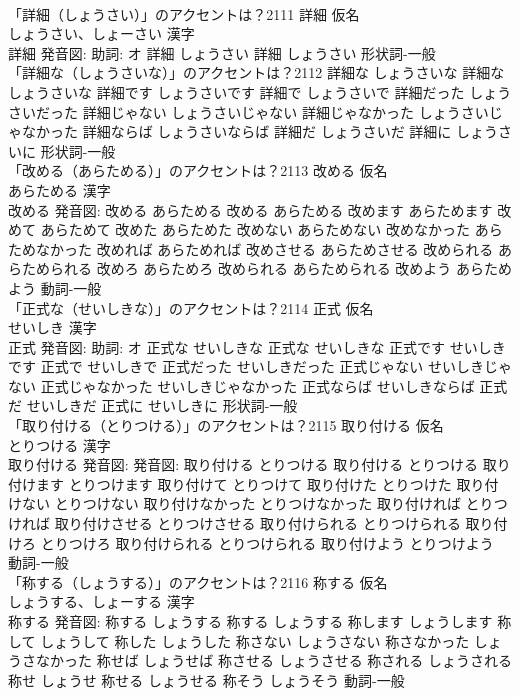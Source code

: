 \documentclass[8pt]{extreport}
\begin{document}
\begin{CJK}{UTF8}{min}
\\	「詳細（しょうさい）」のアクセントは？2111	詳細 仮名　
\\	しょうさい、しょーさい 漢字　
\\	詳細 発音図: 助詞: オ	詳細 しょうさい		詳細 しょうさい				形状詞-一般 
\\	「詳細な（しょうさいな）」のアクセントは？2112		詳細な しょうさいな		詳細な しょうさいな 詳細です しょうさいです 詳細で しょうさいで 詳細だった しょうさいだった 詳細じゃない しょうさいじゃない 詳細じゃなかった しょうさいじゃなかった 詳細ならば しょうさいならば 詳細だ しょうさいだ 詳細に しょうさいに				形状詞-一般 
\\	「改める（あらためる）」のアクセントは？2113	改める 仮名　
\\	あらためる 漢字　
\\	改める 発音図:	改める あらためる		改める あらためる 改めます あらためます 改めて あらためて 改めた あらためた 改めない あらためない 改めなかった あらためなかった 改めれば あらためれば 改めさせる あらためさせる 改められる あらためられる 改めろ あらためろ 改められる あらためられる 改めよう あらためよう				動詞-一般 
\\	「正式な（せいしきな）」のアクセントは？2114	正式 仮名　
\\	せいしき 漢字　
\\	正式 発音図: 助詞: オ	正式な せいしきな		正式な せいしきな 正式です せいしきです 正式で せいしきで 正式だった せいしきだった 正式じゃない せいしきじゃない 正式じゃなかった せいしきじゃなかった 正式ならば せいしきならば 正式だ せいしきだ 正式に せいしきに				形状詞-一般 
\\	「取り付ける（とりつける）」のアクセントは？2115	取り付ける 仮名　
\\	とりつける 漢字　
\\	取り付ける 発音図: 発音図:	取り付ける とりつける		取り付ける とりつける 取り付けます とりつけます 取り付けて とりつけて 取り付けた とりつけた 取り付けない とりつけない 取り付けなかった とりつけなかった 取り付ければ とりつければ 取り付けさせる とりつけさせる 取り付けられる とりつけられる 取り付けろ とりつけろ 取り付けられる とりつけられる 取り付けよう とりつけよう				動詞-一般 
\\	「称する（しょうする）」のアクセントは？2116	称する 仮名　
\\	しょうする、しょーする 漢字　
\\	称する 発音図:	称する しょうする		称する しょうする 称します しょうします 称して しょうして 称した しょうした 称さない しょうさない 称さなかった しょうさなかった 称せば しょうせば 称させる しょうさせる 称される しょうされる 称せ しょうせ 称せる しょうせる 称そう しょうそう				動詞-一般 

\end{CJK}
\end{document}

